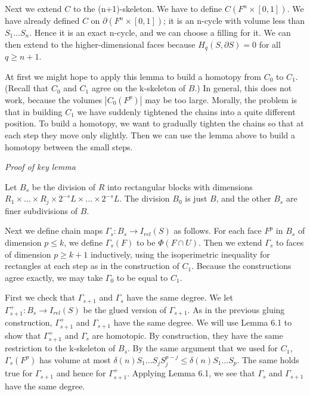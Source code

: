 \documentclass{amsart}
\newtheorem*{Theorem 1}{Theorem 1}
\newtheorem*{Theorem 2}{Theorem 2}
\newtheorem*{Estimate 1}{Estimate 1}
\newtheorem*{Estimate 2}{Estimate 2}
\newtheorem*{key lemma}{Key Lemma}
\numberwithin{equation}{section}
\begin{document}
Next we extend $C$ to the (n+1)-skeleton.  We have to define
$C(F^n \times [0,1])$.  We have already defined $C$ on $\partial(
F^n \times [0,1])$; it is an n-cycle with volume less than
$S_1 ... S_n$.  Hence it is an exact n-cycle, and we can choose
a filling for it.  We can then extend to the higher-dimensional
faces because $H_q(S, \partial S) = 0$ for all $q \ge n+1$.
\endproof

At first we might hope to apply this lemma to build a homotopy
from $C_0$ to $C_1$.  (Recall that $C_0$ and $C_1$ agree on the
k-skeleton of $B$.)  In general, this does not work, because the
volumes $|C_0(F^p)|$ may be too large.  Morally, the problem is
that in building $C_1$ we have suddenly tightened the chains into
a quite different position.  To build a homotopy, we want to
gradually tighten the chains so that at each step they move only
slightly.  Then we can use the lemma above to build a homotopy
between the small steps.

\vskip5pt

{\it Proof of key lemma}

\vskip5pt

Let $B_s$ be the division of $R$ into rectangular blocks with
dimensions $R_1 \times ... \times R_j \times 2^{-s} L \times ...
\times 2^{-s} L$.  The division $B_0$ is just $B$, and the
other $B_s$ are finer subdivisions of $B$.

Next we define chain maps $\Gamma_s: B_s \rightarrow I_{rel}(S)$ as
follows.  For each face $F^p$ in $B_s$ of dimension $p \le k$, we define 
$\Gamma_s(F)$ to be $\Phi(F \cap U)$.  Then we extend $\Gamma_s$ to
faces of dimension $p \ge k+1$ inductively, using the isoperimetric
inequality for rectangles at each step as in the construction of
$C_1$.  Because the constructions agree exactly, we may take
$\Gamma_0$ to be equal to $C_1$.

First we check that $\Gamma_{s+1}$ and $\Gamma_s$ have the same
degree.  We let $\Gamma_{s+1}^+: B_s \rightarrow I_{rel}(S)$ be
the glued version of $\Gamma_{s+1}$.  As in the previous gluing
construction, $\Gamma^+_{s+1}$ and $\Gamma_{s+1}$ have the same
degree.  We will use Lemma 6.1 to show that
$\Gamma_{s+1}^+$ and $\Gamma_s$ are homotopic.  By construction,
they have the same restriction to the k-skeleton of $B_s$.  By
the same argument that we used for $C_1$, $\Gamma_s(F^p)$ has
volume at most $\delta(n) S_1 ... S_j S_j^{p-j} \le \delta(n) S_1 ...
S_p$.  The same holds true for $\Gamma_{s+1}$ and hence for
$\Gamma^+_{s+1}$.  Applying Lemma 6.1, we see that
$\Gamma_s$ and $\Gamma_{s+1}$ have the same degree.
\end{document}
